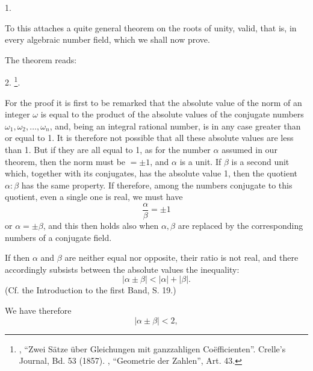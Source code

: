 1. 

To this attaches a quite general theorem on the roots of
unity, valid, that is, in every algebraic number field, which
we shall now prove.

The theorem reads:

2. \footnote{, ``Zwei Sätze über Gleichungen mit ganzzahligen
Co\"efficienten''. Crelle's Journal, Bd. 53 (1857). , ``Geometrie
der Zahlen'', Art. 43.}.

For the proof it is first to be remarked that the absolute
value of the norm of an integer $\omega$ is equal to the product of the
absolute values of the conjugate numbers $\omega_1, \omega_2, \dots, \omega_n$, and,
being an integral rational number, is in any case greater than or
equal to 1. It is therefore not possible that all these absolute
values are less than 1. But if they are all equal to 1, as for the
number $\alpha$ assumed in our theorem, then the norm must be $= \pm 1$,
and $\alpha$ is a unit. If $\beta$ is a second unit which, together with its
conjugates, has the absolute value 1, then the quotient $\alpha : \beta$ has
the same property. If therefore, among the numbers conjugate to
this quotient, even a single one is real, we must have
\[ \frac{\alpha}{\beta} = \pm 1 \]
or $\alpha = \pm \beta$, and this then holds also when $\alpha, \beta$
are replaced by the corresponding numbers of a conjugate
field.

If then $\alpha$ and $\beta$ are neither equal nor opposite, their
ratio is not real, and there accordingly subsists between the
absolute values the inequality:
\[ |\alpha \pm \beta| < |\alpha| + |\beta|. \]
(Cf. the Introduction to the first Band, S. 19.)

We have therefore
\[ |\alpha \pm \beta| < 2, \]
